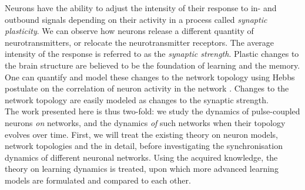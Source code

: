 Neurons have the ability to adjust the intensity of their response to in- and outbound signals depending on their activity in a process called \textsl{synaptic plasticity}. We can observe how neurons release a different quantity of neurotransmitters, or relocate the neurotransmitter receptors. The average intensity of the response is referred to as the \textsl{synaptic strength}. Plastic changes to the brain structure are believed to be the foundation of learning and the memory. One can quantify and model these changes to the network topology using Hebbs postulate on the correlation of neuron activity in the network \cite{Hebb1949}. Changes to the network topology are easily modeled as changes to the synaptic strength.\\

The work presented here is thus two-fold:  we study the dynamics of pulse-coupled neurons \textsl{on} networks, and the dynamics \textsl{of} such networks when their topology evolves over time. First, we will treat the existing theory on neuron models, network topologies and the \MFR in detail, before investigating the synchronisation dynamics of different neuronal networks. Using the acquired knowledge, the theory on learning dynamics is treated, upon which more advanced learning models are formulated and compared to each other.

